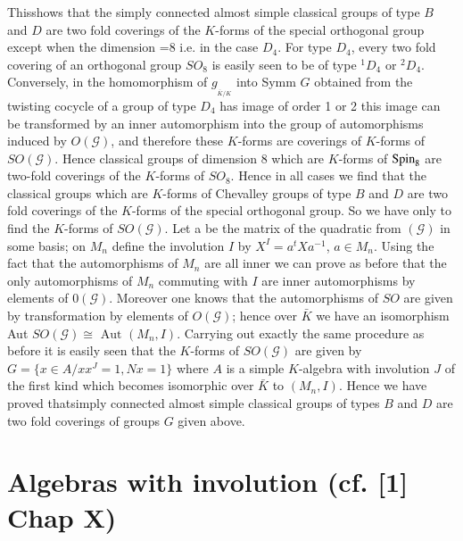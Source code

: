   This\pageoriginale shows that the simply connected almost simple
  classical groups 
  of type $B$ and $D$ are two fold coverings of the $K$-forms of the
  special orthogonal group except when the dimension =8 i.e. in the
  case $D_4$. For type $D_4$, every two fold covering of an orthogonal
  group $SO_8$ is easily seen to be of type ${}^1 D_4$ or
  ${}^2 D_4$. Conversely, in the homomorphism of $g_{_{\bar{K}/K}}$
  into Symm $G$ obtained from the twisting cocycle of a group of type
  $D_4$ has image of order 1 or 2 this image can be transformed by
  an inner automorphism into the group of automorphisms induced by $O
  (\mathscr{G})$, and therefore these $K$-forms are coverings of $K$-forms
  of $SO (\mathscr{G})$. Hence classical groups of dimension 8 which
  are $K$-forms of $\operatorname{Spin}_8$ are two-fold coverings of the $K$-forms of
  $SO_8$. Hence in all cases we find that the classical groups which
  are $K$-forms of Chevalley groups of type $B$ and $D$ are two fold
  coverings of the $K$-forms of the special orthogonal group. So we
  have only to find the $K$-forms of $SO (\mathscr{G})$. Let a be the
  matrix of the quadratic from $(\mathscr{G})$ in some basis; on
  $M_n$ define the involution $I$ by $X^I = a^t Xa^{-1}$, $a \in
  M_n$. Using the fact that the automorphisms of $M_n$ are all inner
  we can prove as before that the only automorphisms of $M_n$
  commuting with $I$ are inner automorphisms by elements of
  $0(\mathscr{G})$. Moreover one knows that the automorphisms of $SO$
  are given by transformation by elements of $O (\mathscr{G})$; hence
  over $\bar{K}$ we have an isomorphism Aut $SO (\mathscr{G}) \cong
  \text{ Aut } (M_n, I)$. Carrying out exactly the same procedure as
  before it is easily seen that the $K$-forms of $SO (\mathscr{G})$ are
  given by $G =\bigg\{ x \in A \bigg /xx^J = 1, Nx = 1 \bigg\}$ where
  $A$ is a simple $K$-algebra with involution $J$ of the first kind
  which becomes isomorphic over $\bar{K}$ to $(M_n,I)$. Hence we have
 proved that\pageoriginale simply connected almost simple classical
 groups of types $B$  and $D$ are two fold coverings of groups $G$ 
 given above. 
  

\section{Algebras with involution (cf. [1] Chap
  X)}\label{chap2:sec2.5} 
  
